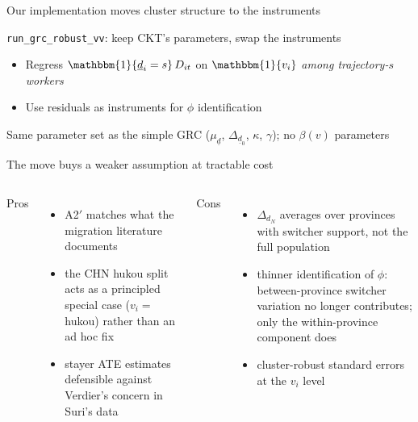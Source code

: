 \documentclass[10pt,aspectratio=169]{beamer}
\newcommand{\D}{D}
\newcommand{\phicoef}{\phi}
\newcommand{\mud}{\mu_{\underline{d}}}
\newcommand{\dN}{d_{N}}
\newcommand{\vii}{v_{i}}
\begin{document}
\begin{frame}{Our implementation moves cluster structure to the instruments}

  \texttt{run\_grc\_robust\_vv}: keep CKT's parameters, swap the instruments
  \begin{itemize}
    \item Regress $\mathbbm{1}\{\underline{d}_i = s\}\,\D_{it}$ on $\mathbbm{1}\{\vii\}$ \emph{among trajectory-$s$ workers}
    \item Use residuals as instruments for $\phicoef$ identification
  \end{itemize}

  \vspace{0.4em}
  Same parameter set as the simple GRC ($\mud$, $\Delta_{\underline{d}_0}$, $\kappa$, $\gamma$); no $\beta(v)$ parameters

\end{frame}

\begin{frame}{The move buys a weaker assumption at tractable cost}

  \begin{columns}[t]
    Pros
    \begin{itemize}
      \item A2$'$ matches what the migration literature documents
      \item the CHN hukou split acts as a principled special case ($\vii = $ hukou) rather than an ad hoc fix
      \item stayer ATE estimates defensible against Verdier's concern in Suri's data
    \end{itemize}

    Cons
    \begin{itemize}
      \item $\Delta_{\dN}$ averages over provinces with switcher support, not the full population
      \item thinner identification of $\phicoef$: between-province switcher variation no longer contributes; only the within-province component does
      \item cluster-robust standard errors at the $\vii$ level
    \end{itemize}
  \end{columns}

\end{frame}
\end{document}
